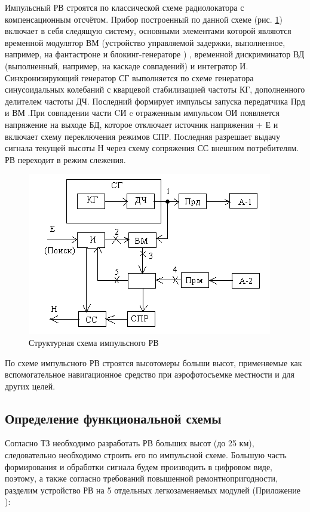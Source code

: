 \documentclass[utf8x, 14pt, oneside, a4paper]{article}
\begin{document}
		Импульсный РВ строятся по классической схеме радиолокатора с компенсационным отсчётом. Прибор построенный по данной схеме (рис. \ref{fig:RV_IM}) включает в себя следящую систему, основными элементами которой являются временной модулятор ВМ (устройство управляемой задержки, выполненное, например, на фантастроне и блокинг-генераторе ) , временной дискриминатор ВД (выполненный, например, на каскаде совпадений) и интегратор И. Синхронизирующий генератор СГ выполняется по схеме генератора синусоидальных колебаний с кварцевой стабилизацией частоты КГ, дополненного делителем частоты ДЧ. Последний формирует импульсы запуска передатчика Прд и ВМ .При совпадении части CИ c отраженным импульсом ОИ появляется напряжение на выходе БД, которое отключает источник напряжения + Е и включает схему переключения режимов СПР. Последняя разрешает выдачу сигнала текущей высоты Н через схему сопряжения СС внешним потребителям. РВ переходит в режим слежения.
		
		\begin{figure}[H]
			\centering
			\includegraphics[width=0.7\linewidth]{"Рисунки/РВ с ИМ"}
			\caption{Структурная схема импульсного РВ}
			\label{fig:RV_IM}
		\end{figure}
		
		По схеме импульсного РВ строятся высотомеры больши высот, применяемые как вспомогательное навигационное средство при аэрофотосъемке местности и для других целей.
		
		
		
		
		\subsection{Определение функциональной схемы}\label{section:func_schem}
			Согласно ТЗ необходимо разработать РВ больших высот (до 25 км), следовательно необходимо строить его по импульсной схеме. Большую часть формирования и обработки сигнала будем производить в цифровом виде, поэтому, а также согласно требований повышенной ремонтнопригодности, разделим устройство РВ на 5 отдельных легкозаменяемых модулей (Приложение ):
			
\end{document}
